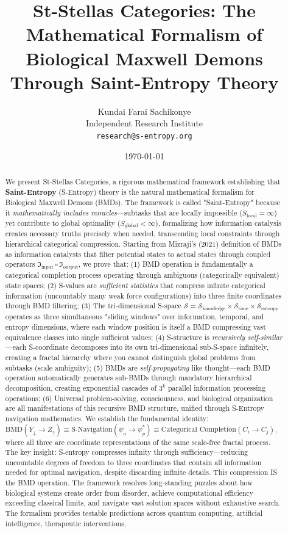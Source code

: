 \documentclass[12pt,a4paper]{article}
\title{St-Stellas Categories: The Mathematical Formalism of Biological Maxwell Demons Through Saint-Entropy Theory}
\author{Kundai Farai Sachikonye\\
Independent Research Institute\\
\texttt{research@s-entropy.org}}
\date{\today}
\begin{document}
\maketitle

\begin{abstract}
We present St-Stellas Categories, a rigorous mathematical framework establishing that \textbf{Saint-Entropy} (S-Entropy) theory is the natural mathematical formalism for Biological Maxwell Demons (BMDs). The framework is called "Saint-Entropy" because it \textit{mathematically includes miracles}—subtasks that are locally impossible ($S_{\text{local}} = \infty$) yet contribute to global optimality ($S_{\text{global}} < \infty$), formalizing how information catalysis creates necessary truths precisely when needed, transcending local constraints through hierarchical categorical compression. Starting from Mizraji's (2021) definition of BMDs as information catalysts that filter potential states to actual states through coupled operators $\Im_{\text{input}} \circ \Im_{\text{output}}$, we prove that: (1) BMD operation is fundamentally a categorical completion process operating through ambiguous (categorically equivalent) state spaces; (2) S-values are \textit{sufficient statistics} that compress infinite categorical information (uncountably many weak force configurations) into three finite coordinates through BMD filtering; (3) The tri-dimensional S-space $\mathcal{S} = \mathcal{S}_{\text{knowledge}} \times \mathcal{S}_{\text{time}} \times \mathcal{S}_{\text{entropy}}$ operates as three simultaneous "sliding windows" over information, temporal, and entropy dimensions, where each window position is itself a BMD compressing vast equivalence classes into single sufficient values; (4) S-structure is \textit{recursively self-similar}—each S-coordinate decomposes into its own tri-dimensional sub-S-space infinitely, creating a fractal hierarchy where you cannot distinguish global problems from subtasks (scale ambiguity); (5) BMDs are \textit{self-propagating} like thought—each BMD operation automatically generates sub-BMDs through mandatory hierarchical decomposition, creating exponential cascades of $3^k$ parallel information processing operations; (6) Universal problem-solving, consciousness, and biological organization are all manifestations of this recursive BMD structure, unified through S-Entropy navigation mathematics. We establish the fundamental identity: $\text{BMD}(Y_{\downarrow} \to Z_{\uparrow}) \equiv \text{S-Navigation}(\psi_o \to \psi_p^*) \equiv \text{Categorical Completion}(C_i \to C_j)$, where all three are coordinate representations of the same scale-free fractal process. The key insight: S-entropy compresses infinity through sufficiency—reducing uncountable degrees of freedom to three coordinates that contain all information needed for optimal navigation, despite discarding infinite details. This compression IS the BMD operation. The framework resolves long-standing puzzles about how biological systems create order from disorder, achieve computational efficiency exceeding classical limits, and navigate vast solution spaces without exhaustive search. The formalism provides testable predictions across quantum computing, artificial intelligence, therapeutic interventions, 
\end{abstract}
\end{document}
